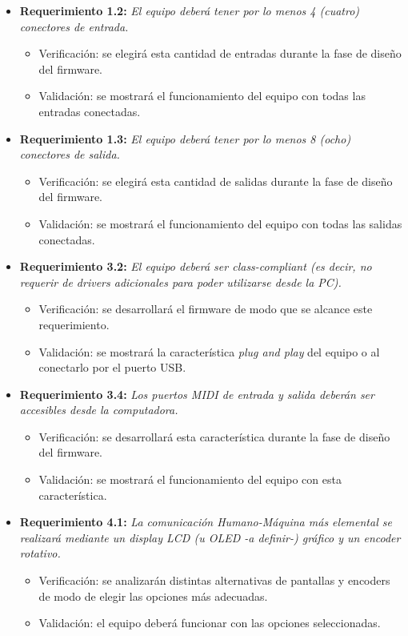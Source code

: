\documentclass[
11pt, %
]{charter}
\begin{document}
\begin{itemize} 	
	\item \textbf{Requerimiento 1.2:} \emph{El equipo deberá tener por lo menos 4 (cuatro) conectores de entrada.}
	\begin{itemize}
		\item Verificación: se elegirá esta cantidad de entradas durante la fase de diseño del firmware.
		\item Validación: se mostrará el funcionamiento del equipo con todas las entradas conectadas.
	\end{itemize}
	
	\item \textbf{Requerimiento 1.3:} \emph{El equipo deberá tener por lo menos 8 (ocho) conectores de salida.}
	\begin{itemize}
		\item Verificación: se elegirá esta cantidad de salidas durante la fase de diseño del firmware.
		\item Validación: se mostrará el funcionamiento del equipo con todas las salidas conectadas.
	\end{itemize}
	
	\item \textbf{Requerimiento 3.2:} \emph{El equipo deberá ser \emph{class-compliant} (es decir, no requerir de drivers adicionales para
	poder utilizarse desde la PC).}
	\begin{itemize}
		\item Verificación: se desarrollará el firmware de modo que se alcance este requerimiento.
		\item Validación: se mostrará la característica \emph{plug and play} del equipo o al conectarlo por el puerto USB.
	\end{itemize}
	
	\item \textbf{Requerimiento 3.4:} \emph{Los puertos MIDI de entrada y salida deberán ser accesibles desde la computadora.}
	\begin{itemize}
		\item Verificación: se desarrollará esta característica durante la fase de diseño del firmware.
		\item Validación: se mostrará el funcionamiento del equipo con esta característica.
	\end{itemize}

	\item \textbf{Requerimiento 4.1:} \emph{La comunicación Humano-Máquina más elemental se realizará mediante un display
	LCD (u OLED -a definir-) gráfico y un encoder rotativo.}
	\begin{itemize}
		\item Verificación: se analizarán distintas alternativas de pantallas y encoders de modo de elegir las opciones más adecuadas.
		\item Validación: el equipo deberá funcionar con las opciones seleccionadas.
	\end{itemize}
	

\end{itemize}
\end{document}
